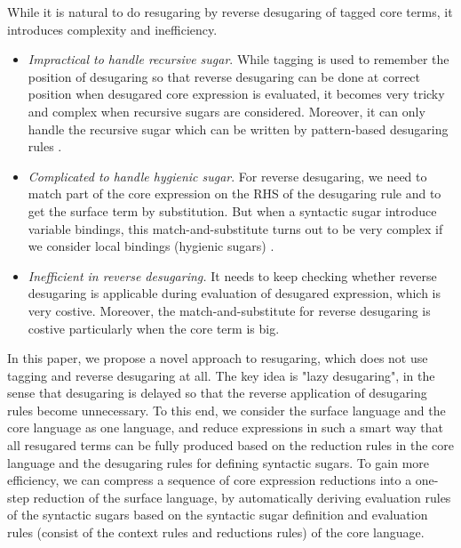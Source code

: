 While it is natural to do resugaring by reverse desugaring of tagged core terms, it introduces complexity and inefficiency.
\begin{itemize}
\item {\em Impractical to handle recursive sugar}. While tagging is used to remember the position of desugaring so that reverse desugaring can be done at correct position when desugared core expression is evaluated, it  becomes very tricky and complex when recursive sugars are considered. Moreover, it can only handle the recursive sugar which can be written by pattern-based desugaring rules \cite{resugaring}.%

\item {\em Complicated to handle hygienic sugar}. For reverse desugaring, we need to match part of the core expression on the RHS of the desugaring rule and to get the surface term by substitution. But when a syntactic sugar introduce variable bindings, this match-and-substitute turns out to be very complex if we consider local bindings (hygienic sugars) \cite{hygienic}.

\item {\em Inefficient in reverse desugaring.} It needs to keep checking whether reverse desugaring is applicable during evaluation of desugared expression, which is very costive. Moreover, the match-and-substitute for reverse desugaring is costive particularly when the core term is big.

\end{itemize}

In this paper, we propose a novel approach to resugaring, which does not use tagging and reverse desugaring at all.
The key idea is "lazy desugaring", in the sense that desugaring is delayed so that the reverse application of desugaring rules become unnecessary.
To this end, we consider the surface language and the core language as one language, and reduce expressions in such a smart way that all resugared terms can be fully produced based on the reduction rules in the core language and  the desugaring rules for defining syntactic sugars. To gain more efficiency, we can compress a sequence of core expression reductions into a one-step reduction of the surface language, by automatically deriving evaluation rules of the syntactic sugars based on the syntactic sugar definition and evaluation rules (consist of the context rules and reductions rules) of the core language.


